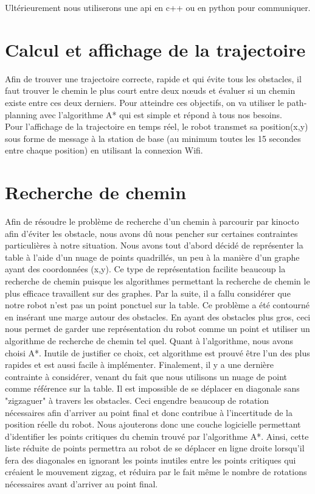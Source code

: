 Ultérieurement nous utiliserons une api en c++ ou en python pour communiquer.

\section{Calcul et affichage de la trajectoire}\label{s:traj}
Afin de trouver une trajectoire correcte, rapide et qui évite tous les obstacles, il faut trouver le chemin le plus court entre deux nœuds et évaluer si un chemin existe entre ces deux derniers.  Pour atteindre ces objectifs, on va utiliser le path-planning  avec l’algorithme A* qui est simple et répond à tous nos besoins.\\
Pour l’affichage de la trajectoire en temps réel, le robot transmet sa position(x,y) sous forme de message à la station de base (au minimum toutes les  15 secondes entre chaque position) en utilisant la connexion Wifi.

\section{Recherche de chemin}
Afin de résoudre le problème de recherche d'un chemin à parcourir par kinocto afin d'éviter les obstacle, nous avons dû nous pencher sur certaines contraintes particulières à notre situation. Nous avons tout d'abord décidé de représenter la table à l'aide d'un nuage de points quadrillés, un peu à la manière d'un graphe ayant des coordonnées (x,y). Ce type de représentation facilite beaucoup la recherche de chemin puisque les algorithmes permettant la recherche de chemin le plus efficace travaillent sur des graphes.  Par la suite, il a fallu considérer que notre robot n'est pas un point ponctuel sur la table. Ce problème a été contourné en insérant une marge autour des obstacles. En ayant des obstacles plus gros, ceci nous permet de garder une représentation du robot comme un point et utiliser un algorithme de recherche de chemin tel quel. Quant à l'algorithme, nous avons choisi A*. Inutile de justifier ce choix, cet algorithme est prouvé être l'un des plus rapides et est aussi facile à implémenter. Finalement, il y a une dernière contrainte à considérer, venant du fait que nous utilisons un nuage de point comme référence sur la table. Il est impossible de se déplacer en diagonale sans "zigzaguer" à travers les obstacles. Ceci engendre beaucoup de rotation nécessaires afin d'arriver au point final et donc contribue à l'incertitude de la position réelle du robot. Nous ajouterons donc une couche logicielle permettant d'identifier les points critiques du chemin trouvé par l'algorithme A*. Ainsi, cette liste réduite de points permettra au robot de se déplacer en ligne droite lorsqu'il fera des diagonales en ignorant les points inutiles entre les points critiques qui créaient le mouvement zigzag, et réduira par le fait même le nombre de rotations nécessaires avant d'arriver au point final. 
